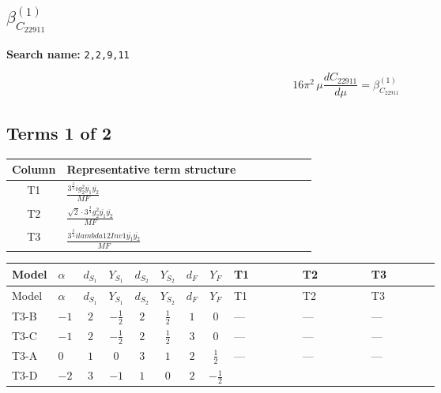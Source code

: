 \documentclass[8pt]{article}
\begin{document}
\begin{landscape}
\section*{$\beta_{C_{22911}}^{(1)}$}
\noindent\textbf{Search name: }\texttt{2,2,9,11}\par\smallskip
\[16\pi^2\,\mu\frac{d C_{22911}}{d\mu}=\beta_{C_{22911}}^{(1)}\]
\subsection*{Terms 1 of 2}
\begin{center}
\begin{tabular}{@{}c >{\raggedright\arraybackslash}p{0.82\linewidth}@{}}
\toprule
Column & Representative term structure \\
\midrule
T1 & \(\displaystyle \frac{3^{\frac{3}{4}} i g_{2}^{2} \overline{y_{1}} \overline{y_{2}}}{MF}\) \\
\midrule
T2 & \(\displaystyle \frac{\sqrt{2} \cdot 3^{\frac{3}{4}} g_{2}^{2} \overline{y_{1}} \overline{y_{2}}}{MF}\) \\
\midrule
T3 & \(\displaystyle \frac{3^{\frac{3}{4}} i lambda12Inv1 \overline{y_{1}} \overline{y_{2}}}{MF}\) \\
\midrule
\bottomrule
\end{tabular}
\end{center}
\smallskip
\tiny
\begin{longtable}{@{}llcccccc >{\raggedright\arraybackslash}p{0.21\linewidth} >{\raggedright\arraybackslash}p{0.21\linewidth} >{\raggedright\arraybackslash}p{0.21\linewidth}@{}}
\toprule
Model & $\alpha$ & $d_{S_1}$ & $Y_{S_1}$ & $d_{S_2}$ & $Y_{S_2}$ & $d_F$ & $Y_F$ & T1 & T2 & T3 \\
\midrule
\endfirsthead
\toprule
Model & $\alpha$ & $d_{S_1}$ & $Y_{S_1}$ & $d_{S_2}$ & $Y_{S_2}$ & $d_F$ & $Y_F$ & T1 & T2 & T3 \\
\midrule
\endhead
T3-B & $-1$ & $2$ & $-\frac{1}{2}$ & $2$ & $\frac{1}{2}$ & $1$ & $0$ & --- & --- & --- \\
\midrule
T3-C & $-1$ & $2$ & $-\frac{1}{2}$ & $2$ & $\frac{1}{2}$ & $3$ & $0$ & --- & --- & --- \\
\midrule
T3-A & $0$ & $1$ & $0$ & $3$ & $1$ & $2$ & $\frac{1}{2}$ & --- & --- & --- \\
\midrule
T3-D & $-2$ & $3$ & $-1$ & $1$ & $0$ & $2$ & $-\frac{1}{2}$ & \scriptsize\adjustbox{max width=\linewidth}{$\begin{gathered} - \frac{17 \cdot 3^{\frac{3}{4}} i g_{2}^{2} \overline{y_{1}} \overline{y_{2}}}{24 MF}\end{gathered}$} & \scriptsize\adjustbox{max width=\linewidth}{$\begin{gathered} - \frac{\sqrt{2} \cdot 3^{\frac{3}{4}} g_{2}^{2} \overline{y_{1}} \overline{y_{2}}}{3 MF}\end{gathered}$} & \scriptsize\adjustbox{max width=\linewidth}{$\begin{gathered} - \frac{3^{\frac{3}{4}} i lambda12Inv1 \overline{y_{1}} \overline{y_{2}}}{6 MF}\end{gathered}$} \\

\end{longtable}
\end{landscape}
\end{document}
